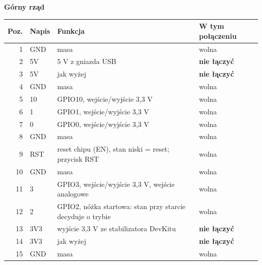 \documentclass[10pt]{article}
\begin{document}
\renewcommand{\arraystretch}{1.25}
\begin{minipage}[t]{0.49\linewidth}
\textbf{Górny rząd}\\[2pt]
\footnotesize
\begin{tabular}{@{}r l p{4.9cm} p{2.9cm}@{}}
\toprule
\rowcolor{black!8}\textbf{Poz.} & \textbf{Napis} & \textbf{Funkcja} & \textbf{W tym połączeniu} \\
\midrule
1 & GND & masa & wolna \\
2 & 5V & 5 V z gniazda USB & \textbf{nie łączyć} \\
3 & 5V & jak wyżej & \textbf{nie łączyć} \\
4 & GND & masa & wolna \\
5 & 10 & GPIO10, wejście/wyjście 3,3 V & wolna \\
6 & 1 & GPIO1, wejście/wyjście 3,3 V & wolna \\
7 & 0 & GPIO0, wejście/wyjście 3,3 V & wolna \\
8 & GND & masa & wolna \\
9 & RST & reset chipu (EN), stan niski = reset; przycisk RST & wolna \\
10 & GND & masa & wolna \\
11 & 3 & GPIO3, wejście/wyjście 3,3 V, wejście analogowe & wolna \\
12 & 2 & GPIO2, nóżka startowa: stan przy starcie decyduje o trybie & wolna \\
13 & 3V3 & wyjście 3,3 V ze stabilizatora DevKitu & \textbf{nie łączyć} \\
14 & 3V3 & jak wyżej & \textbf{nie łączyć} \\
15 & GND & masa & wolna \\
\bottomrule
\end{tabular}
\end{minipage}\hfill
\end{document}
